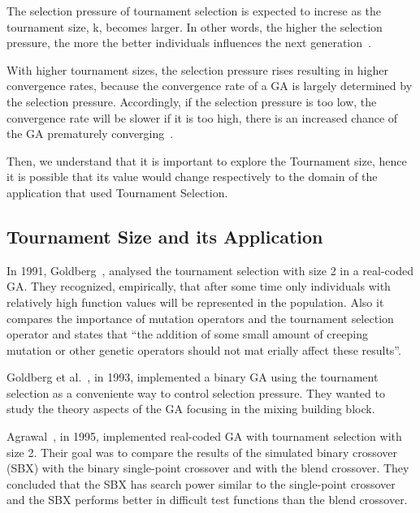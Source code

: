 The selection pressure of tournament selection is expected to increse as the tournament size, k, becomes larger. In other words, the higher the selection pressure, the more the better individuals influences the next generation~\cite{miller1995genetic}.  

With higher tournament sizes, the selection pressure rises resulting in higher convergence rates, because the convergence rate of a GA is largely determined by the selection pressure.  Accordingly, if the selection pressure is too low, the convergence rate will be slower if it is too high, there is an increased chance of the GA prematurely converging~\cite{miller1995genetic}. 

Then, we understand that it is important to explore the Tournament size, hence it is possible that its value would change respectively to the domain of the application that used Tournament Selection.

\subsection{Tournament Size and its Application}\label{sec:background:tournament_size} 

In 1991, Goldberg~\cite{goldberg1991real}, analysed the tournament selection with size 2 in a real-coded GA. They recognized, empirically, that after some time only individuals with relatively high function values will be represented in the population. Also it compares the importance of mutation operators and the tournament selection operator and states that ``the addition of some small amount of creeping mutation or other genetic operators should not mat erially affect these results''.

Goldberg et al.~\cite{goldberg1993toward}, in 1993, implemented a binary GA using the tournament selection as a conveniente way to control selection pressure. They wanted to study the theory aspects of the GA focusing in the mixing building block.

Agrawal~\cite{agrawal1995simulated}, in 1995, implemented real-coded GA with tournament selection with size 2. Their goal was to compare the results of the simulated binary crossover (SBX) with the binary single-point crossover and with the blend crossover. They concluded that the SBX  has search power similar to the single-point crossover and the SBX performs better in difficult test functions than the blend crossover. 

